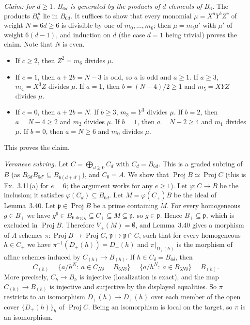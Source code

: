 \documentclass[11pt]{article}
\begin{document}
\emph{Claim: for $d\ge1$, $B_{6d}$ is generated by the products of $d$ elements of $B_6$.} The products $B_6^{\,d}$ lie in $B_{6d}$. It suffices to show that every monomial $\mu=X^aY^bZ^c$ of weight $N=6d\ge6$ is divisible by one of $m_0,\dots,m_6$; then $\mu=m_i\mu'$ with $\mu'$ of weight $6(d-1)$, and induction on $d$ (the case $d=1$ being trivial) proves the claim. Note that $N$ is even.
\begin{itemize}
\item If $c\ge2$, then $Z^2=m_6$ divides $\mu$.
\item If $c=1$, then $a+2b=N-3$ is odd, so $a$ is odd and $a\ge1$. If $a\ge3$, $m_4=X^3Z$ divides $\mu$. If $a=1$, then $b=(N-4)/2\ge1$ and $m_5=XYZ$ divides $\mu$.
\item If $c=0$, then $a+2b=N$. If $b\ge3$, $m_3=Y^3$ divides $\mu$. If $b=2$, then $a=N-4\ge2$ and $m_2$ divides $\mu$. If $b=1$, then $a=N-2\ge4$ and $m_1$ divides $\mu$. If $b=0$, then $a=N\ge6$ and $m_0$ divides $\mu$.
\end{itemize}
This proves the claim.

\emph{Veronese subring.} Let $C=\bigoplus_{d\ge0}C_d$ with $C_d=B_{6d}$. This is a graded subring of $B$ (as $B_{6d}B_{6d'}\subseteq B_{6(d+d')}$), and $C_0=A$. We show that $\operatorname{Proj}B\simeq\operatorname{Proj}C$ (this is Ex.~3.11(a) for $e=6$; the argument works for any $e\ge1$). Let $\varphi:C\to B$ be the inclusion; it satisfies $\varphi(C_d)\subseteq B_{6d}$. Let $M=\varphi(C_+)B$ be the ideal of Lemma~3.40. Let $\mathfrak p\in\operatorname{Proj}B$ be a prime containing $M$. For every homogeneous $g\in B_+$ we have $g^6\in B_{6\deg g}\subseteq C_+\subseteq M\subseteq\mathfrak p$, so $g\in\mathfrak p$. Hence $B_+\subseteq\mathfrak p$, which is excluded in $\operatorname{Proj}B$. Therefore $V_+(M)=\emptyset$, and Lemma~3.40 gives a morphism of $A$-schemes $\pi:\operatorname{Proj}B\to\operatorname{Proj}C$, $\mathfrak p\mapsto\mathfrak p\cap C$, such that for every homogeneous $h\in C_+$ we have $\pi^{-1}(D_+(h))=D_+(h)$ and $\pi|_{D_+(h)}$ is the morphism of affine schemes induced by $C_{(h)}\to B_{(h)}$. If $h\in C_{\delta}=B_{6\delta}$, then
\[ C_{(h)}=\{a/h^N:\ a\in C_{N\delta}=B_{6N\delta}\}=\{a/h^N:\ a\in B_{6N\delta}\}=B_{(h)} . \]
More precisely, $C_h\to B_h$ is injective (localization is exact), and the map $C_{(h)}\to B_{(h)}$ is injective and surjective by the displayed equalities. So $\pi$ restricts to an isomorphism $D_+(h)\to D_+(h)$ over each member of the open cover $\{D_+(h)\}_h$ of $\operatorname{Proj}C$. Being an isomorphism is local on the target, so $\pi$ is an isomorphism.
\end{document}
